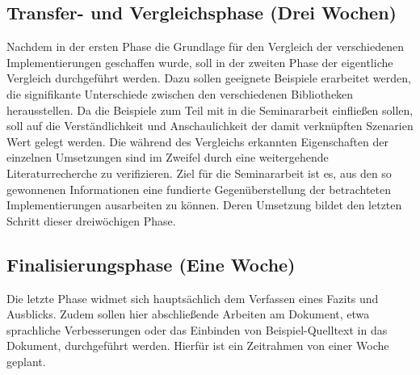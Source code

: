 \documentclass{article}
\begin{document}
\subsection{Transfer- und Vergleichsphase (Drei Wochen)}
Nachdem in der ersten Phase die Grundlage für den Vergleich der verschiedenen Implementierungen geschaffen wurde, soll in der zweiten Phase der eigentliche Vergleich durchgeführt werden.
Dazu sollen geeignete Beispiele erarbeitet werden, die signifikante Unterschiede zwischen den verschiedenen Bibliotheken herausstellen.
Da die Beispiele zum Teil mit in die Seminararbeit einfließen sollen, soll auf die Verständlichkeit und Anschaulichkeit der damit verknüpften Szenarien Wert gelegt werden.
Die während des Vergleichs erkannten Eigenschaften der einzelnen Umsetzungen sind im Zweifel durch eine weitergehende Literaturrecherche zu verifizieren.
Ziel für die Seminararbeit ist es, aus den so gewonnenen Informationen eine fundierte Gegenüberstellung der betrachteten Implementierungen ausarbeiten zu können.
Deren Umsetzung bildet den letzten Schritt dieser dreiwöchigen Phase.

\subsection{Finalisierungsphase (Eine Woche)}
Die letzte Phase widmet sich hauptsächlich dem Verfassen eines Fazits und Ausblicks.
Zudem sollen hier abschließende Arbeiten am Dokument, etwa sprachliche Verbesserungen oder das Einbinden von Beispiel-Quelltext in das Dokument, durchgeführt werden.
Hierfür ist ein Zeitrahmen von einer Woche geplant.

\newpage
\nocite{*}


\end{document}
